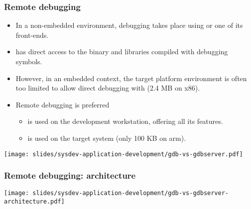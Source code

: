 \begin{frame}
  \frametitle{Remote debugging}
  \begin{itemize}
  \item In a non-embedded environment, debugging takes place using 
    or one of its front-ends.
  \item {} has direct access to the binary and libraries compiled
    with debugging symbols.
  \item However, in an embedded context, the target platform
    environment is often too limited to allow direct debugging with
     (2.4 MB on x86).
  \item Remote debugging is preferred
    \begin{itemize}
    \item {} is used on the development workstation, offering
      all its features.
    \item {} is used on the target system (only 100 KB
      on arm).
    \end{itemize}
  \end{itemize}
  \begin{center}
    \texttt{[image: slides/sysdev-application-development/gdb-vs-gdbserver.pdf]}
  \end{center}
\end{frame}

\begin{frame}
  \frametitle{Remote debugging: architecture}
  \begin{center}
    \texttt{[image: slides/sysdev-application-development/gdb-vs-gdbserver-architecture.pdf]}
  \end{center}
\end{frame}


